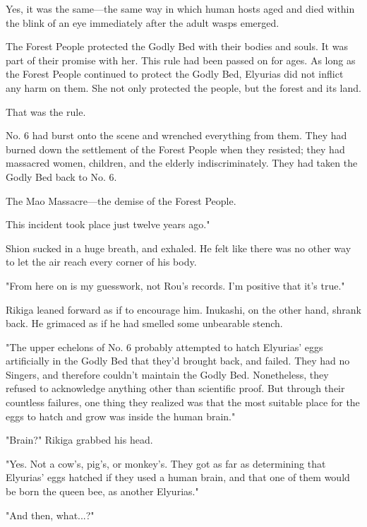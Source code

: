 Yes, it was the same---the same way in which human hosts aged and died
within the blink of an eye immediately after the adult wasps emerged.

The Forest People protected the Godly Bed with their bodies and souls.
It was part of their promise with her. This rule had been passed on for
ages. As long as the Forest People continued to protect the Godly Bed,
Elyurias did not inflict any harm on them. She not only protected the
people, but the forest and its land.

That was the rule.

No. 6 had burst onto the scene and wrenched everything from them. They
had burned down the settlement of the Forest People when they resisted;
they had massacred women, children, and the elderly indiscriminately.
They had taken the Godly Bed back to No. 6.

The Mao Massacre---the demise of the Forest People.

This incident took place just twelve years ago."

Shion sucked in a huge breath, and exhaled. He felt like there was no
other way to let the air reach every corner of his body.

"From here on is my guesswork, not Rou's records. I'm positive that it's
true."

Rikiga leaned forward as if to encourage him. Inukashi, on the other
hand, shrank back. He grimaced as if he had smelled some unbearable
stench.

"The upper echelons of No. 6 probably attempted to hatch Elyurias' eggs
artificially in the Godly Bed that they'd brought back, and failed. They
had no Singers, and therefore couldn't maintain the Godly Bed.
Nonetheless, they refused to acknowledge anything other than scientific
proof. But through their countless failures, one thing they realized was
that the most suitable place for the eggs to hatch and grow was inside
the human brain."

"Brain?" Rikiga grabbed his head.

"Yes. Not a cow's, pig's, or monkey's. They got as far as determining
that Elyurias' eggs hatched if they used a human brain, and that one of
them would be born the queen bee, as another Elyurias."

"And then, what...?"

